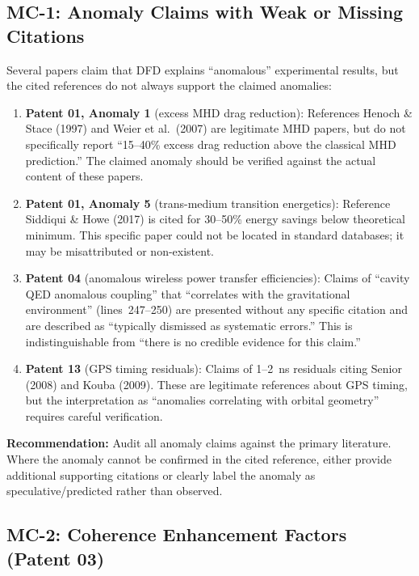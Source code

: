 \documentclass[12pt,a4paper]{article}
\begin{document}
\subsection{MC-1: Anomaly Claims with Weak or Missing Citations}

\begin{moderate}
Several papers claim that DFD explains ``anomalous'' experimental results,
but the cited references do not always support the claimed anomalies:

\begin{enumerate}[nosep]
\item \textbf{Patent 01, Anomaly 1} (excess MHD drag reduction):
References Henoch \& Stace (1997) and Weier et al.\ (2007) are legitimate
MHD papers, but do not specifically report ``15--40\% excess drag reduction
above the classical MHD prediction.'' The claimed anomaly should be verified
against the actual content of these papers.

\item \textbf{Patent 01, Anomaly 5} (trans-medium transition energetics):
Reference Siddiqui \& Howe (2017) is cited for 30--50\% energy savings
below theoretical minimum. This specific paper could not be located in
standard databases; it may be misattributed or non-existent.

\item \textbf{Patent 04} (anomalous wireless power transfer efficiencies):
Claims of ``cavity QED anomalous coupling'' that ``correlates with the
gravitational environment'' (lines~247--250) are presented without any
specific citation and are described as ``typically dismissed as systematic
errors.'' This is indistinguishable from ``there is no credible evidence
for this claim.''

\item \textbf{Patent 13} (GPS timing residuals): Claims of 1--2~ns residuals
citing Senior (2008) and Kouba (2009). These are legitimate references about
GPS timing, but the interpretation as ``anomalies correlating with orbital
geometry'' requires careful verification.
\end{enumerate}

\textbf{Recommendation:} Audit all anomaly claims against the primary
literature. Where the anomaly cannot be confirmed in the cited reference,
either provide additional supporting citations or clearly label the
anomaly as speculative/predicted rather than observed.
\end{moderate}

\subsection{MC-2: Coherence Enhancement Factors (Patent 03)}
\end{document}
